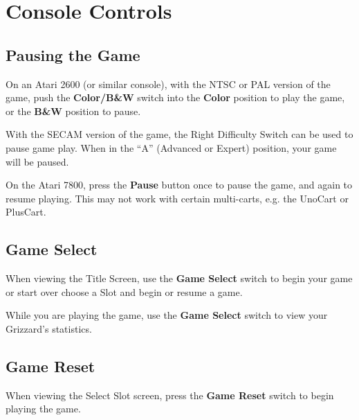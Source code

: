 \documentclass[10pt,twocolumn,openany,article]{memoir}
\begin{document}
\pagebreak
{}

\section{Console Controls}

\ifdefined\ATARIAGESAVE\vfill\fi

\subsection{Pausing the Game}

On an Atari 2600  (or similar console), with the NTSC  or PAL version of
the game,  push the  \textbf{Color/B\&W} switch into  the \textbf{Color}
position  to play  the game,  or  the \textbf{B\&W}  position to  pause.

\vfill

With the SECAM  version of the game, the Right  Difficulty Switch can be
used  to  pause game  play.  When  in  the  ``A'' (Advanced  or  Expert)
position, your  game will be paused.

\vfill

On the  Atari 7800, press  the \textbf{Pause}  button once to  pause the
game, and again to resume playing. \ifdefined\ATARIAGESAVE\else This may
not work with certain multi-carts, e.g. the UnoCart or PlusCart. \fi

\ifdefined\ATARIAGESAVE\vfill\fi

\subsection{Game Select}

When viewing  the Title Screen,  use the \textbf{Game Select}  switch to
\ifdefined\NOSAVE begin your game or start  over \else choose a Slot and
begin or resume a game. \fi

While you  are playing the  game, use the  \textbf{Game Select}
switch to view your Grizzard's  statistics.

\ifdefined\ATARIAGESAVE\vfill\pagebreak\fi

\subsection{Game Reset}

When  viewing the  Select  Slot screen,  press  the \textbf{Game  Reset}
switch to begin playing the game.
\end{document}
